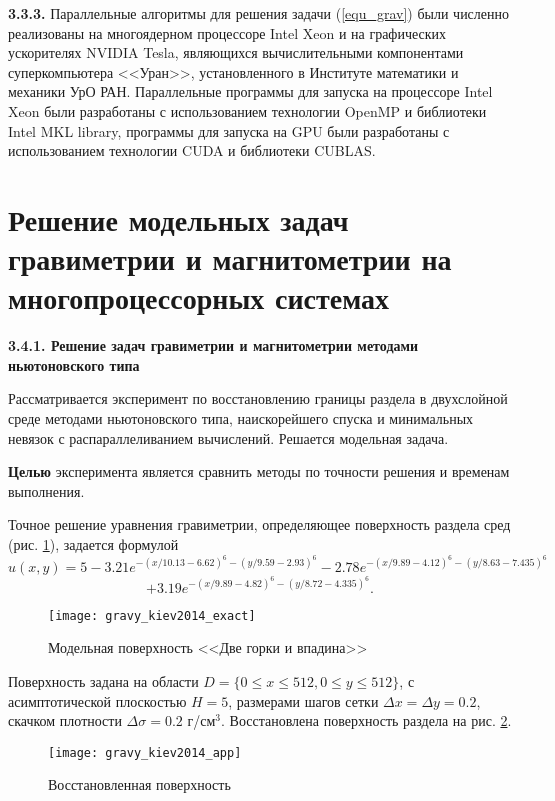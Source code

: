 {\bfseries 3.3.3.} Параллельные алгоритмы для решения задачи  (\ref{equ_grav}) были численно реализованы на многоядерном процессоре Intel Xeon и на графических ускорителях NVIDIA Tesla, являющихся вычислительными компонентами суперкомпьютера <<Уран>>, установленного в Институте математики и механики УрО РАН. Параллельные программы для запуска на процессоре Intel Xeon были разработаны с использованием технологии OpenMP и библиотеки Intel MKL library, программы для запуска на GPU были разработаны с использованием технологии CUDA и библиотеки CUBLAS. 

\newpage
\section{Решение модельных задач гравиметрии и магнитометрии на многопроцессорных системах}

{\bfseries 3.4.1. Решение задач гравиметрии и магнитометрии методами ньютоновского типа} 

Рассматривается эксперимент по восстановлению границы раздела в двухслойной среде методами ньютоновского типа, наискорейшего спуска и минимальных невязок с распараллеливанием вычислений. Решается модельная задача. 

{\bfseries Целью} эксперимента является сравнить методы по точности решения и временам выполнения. 

Точное решение уравнения гравиметрии, определяющее поверхность раздела сред (рис. \ref{fig:gravy_kiev2014_exact}), задается формулой
$$\hat{u}(x,y)=5-3.21e^{-(x/10.13-6.62)^6-(y/9.59-2.93)^6}-2.78e^{-(x/9.89-4.12)^6-(y/8.63-7.435)^6}$$ 
\begin{equation}\label{exact_exp3.4.1}
+3.19e^{-(x/9.89-4.82)^6-(y/8.72-4.335)^6}.
\end{equation}
\begin{figure}[h]
	\centering
	\texttt{[image: gravy\_kiev2014\_exact]}
	\caption{Модельная поверхность <<Две горки и впадина>>}
	\label{fig:gravy_kiev2014_exact}
\end{figure}
Поверхность задана на области $D=\{0\le x\le 512, 0\le y\le 512\}$, с асимптотической плоскостью $H=5$, размерами шагов сетки $\Delta x=\Delta y=0.2$, скачком плотности $\Delta\sigma=0.2$ г/см$^3$. Восстановлена поверхность раздела на рис. \ref{fig:gravy_kiev2014_app}.
\begin{figure}[h]
	\centering
	\texttt{[image: gravy\_kiev2014\_app]}
	\caption{Восстановленная поверхность}
	\label{fig:gravy_kiev2014_app}
\end{figure}

